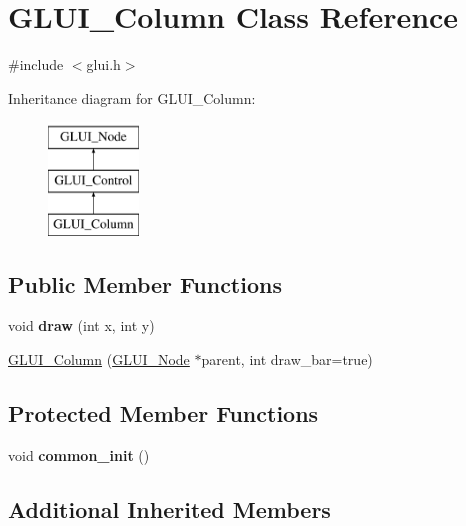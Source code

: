 \hypertarget{classGLUI__Column}{\section{G\-L\-U\-I\-\_\-\-Column Class Reference}
\label{classGLUI__Column}
}


{\ttfamily \#include $<$glui.\-h$>$}

Inheritance diagram for G\-L\-U\-I\-\_\-\-Column\-:\begin{figure}[H]
\begin{center}
\leavevmode
\includegraphics[height=3.000000cm]{classGLUI__Column}
\end{center}
\end{figure}
\subsection*{Public Member Functions}
\begin{DoxyCompactItemize}
\item 
\hypertarget{classGLUI__Column_aefa72a27e5a6ba5e86f684b6a5b5f63e}{void {\bfseries draw} (int x, int y)}\label{classGLUI__Column_aefa72a27e5a6ba5e86f684b6a5b5f63e}

\item 
\hyperlink{classGLUI__Column_a309d2c36583fb571763c95d8ae3bbaa3}{G\-L\-U\-I\-\_\-\-Column} (\hyperlink{classGLUI__Node}{G\-L\-U\-I\-\_\-\-Node} $\ast$parent, int draw\-\_\-bar=true)
\end{DoxyCompactItemize}
\subsection*{Protected Member Functions}
\begin{DoxyCompactItemize}
\item 
\hypertarget{classGLUI__Column_af5aa315100428399f2a7920fb9eb53b7}{void {\bfseries common\-\_\-init} ()}\label{classGLUI__Column_af5aa315100428399f2a7920fb9eb53b7}

\end{DoxyCompactItemize}
\subsection*{Additional Inherited Members}



